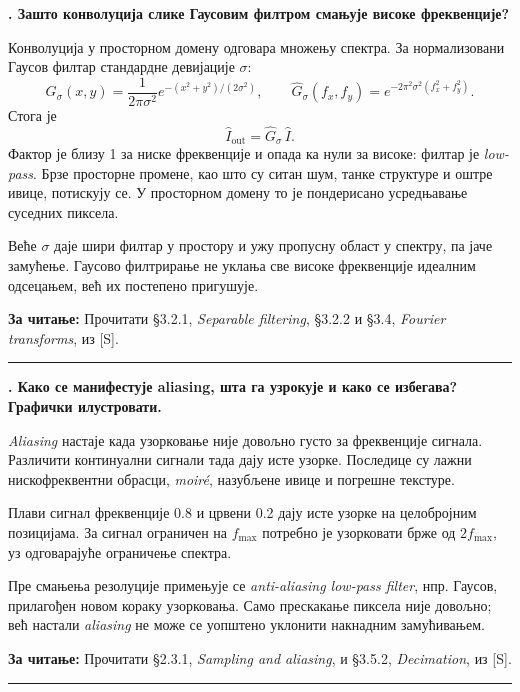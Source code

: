 \documentclass[10pt,a4paper]{article}
\newcommand{\en}[1]{\textit{#1}}
\newcounter{pitanje}
\newenvironment{odgovor}[1]{\stepcounter{pitanje}\begin{minipage}[t][0.455\textheight][t]{\textwidth}\vspace{0pt}\textbf{\thepitanje. #1}\par\smallskip}{\end{minipage}\par\ifodd\value{pitanje}\vspace{0.025\textheight}\hrule\vspace{0.015\textheight}\else\newpage\fi}
\newcommand{\izvor}[1]{\par\vfill{\footnotesize\textbf{За читање:} #1}\par}
\begin{document}
\begin{odgovor}{Зашто конволуција слике Гаусовим филтром смањује високе фреквенције?}
Конволуција у просторном домену одговара множењу спектра. За нормализовани Гаусов филтар стандардне девијације $\sigma$:
\[
G_\sigma(x,y)=\frac1{2\pi\sigma^2}e^{-(x^2+y^2)/(2\sigma^2)},\qquad
\widehat G_\sigma(f_x,f_y)=e^{-2\pi^2\sigma^2(f_x^2+f_y^2)}.
\]
Стога је
\[
\widehat I_{\mathrm{out}}=\widehat G_\sigma\,\widehat I.
\]
Фактор је близу 1 за ниске фреквенције и опада ка нули за високе: филтар је \en{low-pass}. Брзе просторне промене, као што су ситан шум, танке структуре и оштре ивице, потискују се. У просторном домену то је пондерисано усредњавање суседних пиксела.

Веће $\sigma$ даје шири филтар у простору и ужу пропусну област у спектру, па јаче замућење. Гаусово филтрирање не уклања све високе фреквенције идеалним одсецањем, већ их постепено пригушује.
\izvor{Прочитати §3.2.1, \en{Separable filtering}, §3.2.2 и §3.4, \en{Fourier transforms}, из [S].}
\end{odgovor}

\begin{odgovor}{Како се манифестује aliasing, шта га узрокује и како се избегава? Графички илустровати.}
\en{Aliasing} настаје када узорковање није довољно густо за фреквенције сигнала. Различити континуални сигнали тада дају исте узорке. Последице су лажни нискофреквентни обрасци, \en{moiré}, назубљене ивице и погрешне текстуре.
\begin{center}\end{center}
Плави сигнал фреквенције 0.8 и црвени 0.2 дају исте узорке на целобројним позицијама. За сигнал ограничен на $f_{\max}$ потребно је узорковати брже од $2f_{\max}$, уз одговарајуће ограничење спектра.

Пре смањења резолуције примењује се \en{anti-aliasing low-pass filter}, нпр. Гаусов, прилагођен новом кораку узорковања. Само прескакање пиксела није довољно; већ настали \en{aliasing} не може се уопштено уклонити накнадним замућивањем.
\izvor{Прочитати §2.3.1, \en{Sampling and aliasing}, и §3.5.2, \en{Decimation}, из [S].}
\end{odgovor}
\end{document}

